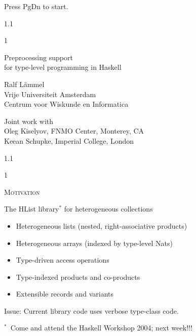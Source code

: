 \documentclass{slides}
\newcommand{\littleskip}{\topsep6pt \parskip6pt \partopsep6pt}
\newcommand{\header}[1]{{\large\scshape \color{Red} #1} \medskip }
\newcommand{\blau}[1]{{\color{Blue} #1} \medskip }
\newenvironment{myslide}{\begin{slide}\color{Blue}\begin{boxedminipage}{1.1\hsize}\begin{boxedminipage}{1\hsize}\color{Black}
\vspace{-170\in}
}{%
\smallskip
\end{boxedminipage}
\end{boxedminipage}
\end{slide}}
\begin{document}
\pagestyle{empty}

\makeatactive


\begin{slide}

Press PgDn to start.

\end{slide}






\begin{myslide}

\bigskip

\header{
\begin{center}
Preprocessing support\\ for type-level programming in Haskell
\end{center}
}

\vspace{200\in}

\blau{Ralf L{\"a}mmel\\
Vrije Universiteit Amsterdam\\
Centrum voor Wiskunde en Informatica}

\bigskip
Joint work with\\
Oleg Kiselyov, FNMO Center, Monterey, CA\\
Keean Schupke, Imperial College, London

\bigskip

\end{myslide}






\begin{myslide}

\header{Motivation}

\blau{The HList library$^*$ for heterogeneous collections}

{\small

\littleskip\begin{itemize}
\item Heterogeneous lists (nested, right-associative products)
\item Heterogeneous arrays (indexed by type-level Nats)
\item Type-driven access operations
\item Type-indexed products and co-products
\item Extensible records and variants
\end{itemize}

Issue: Current library code uses verbose type-class code.

\bigskip

$^*$\ Come and attend the Haskell Workshop 2004; next week!!!

}

\end{myslide}
\end{document}
